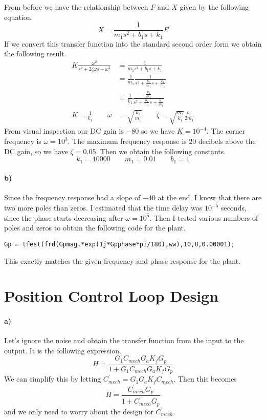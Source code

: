 \documentclass[12pt]{article}
\begin{document}
From before we have the relationship between \(F\) and \(X\) given by the following equation.
\[X=\frac{1}{m_1s^2 + b_1s + k_1}F\]
If we convert this transfer function into the standard second order form we obtain the following result.
\begin{align*}
    K\frac{\omega^2}{s^2+2\zeta\omega s + \omega^2}&=\frac{1}{m_1s^2 + b_1s + k_1}\\
    &=\frac{1}{m_1}\frac{1}{s^2 + \frac{b_1}{m_1}s + \frac{k_1}{m_1}}\\
    &=\frac{1}{k_1}\frac{\frac{k_1}{m_1}}{s^2 + \frac{b_1}{m_1}s + \frac{k_1}{m_1}}\\
    K=\frac{1}{k_1}\qquad \omega&=\sqrt{\frac{k_1}{m_1}}\qquad\zeta=\sqrt{\frac{m_1}{k_1}}\frac{b_1}{2m_1}
\end{align*}
From visual inspection our DC gain is \(-80\) so we have \(K=10^{-4}\). The corner frequency is \(\omega=10^3\).
The maximum frequency response is \(20\) decibels above the DC gain, so we have \(\zeta=0.05\). Then we obtain
the following constants.
\[k_1=10000 \qquad m_1=0.01 \qquad b_1=1\]

\paragraph{b)}

Since the frequency response had a slope of \(-40\) at the end, I know that there are two more poles than zeros.
I estimated that the time delay was \(10^{-5}\) seconds, since the phase starts decreasing after \(\omega=10^5\).
Then I tested various numbers of poles and zeros to obtain the following code for the plant.
\begin{verbatim}
Gp = tfest(frd(Gpmag.*exp(1j*Gpphase*pi/180),ww),10,8,0.00001);
\end{verbatim}
This exactly matches the given frequency and phase response for the plant.

\section{Position Control Loop Design}

\paragraph{a)}

Let's ignore the noise and obtain the transfer function from the input to the output. It is the following expression.
\[H = \frac{G_1C_{mech}G_aK_fG_p}{1+G_1C_{mech}G_aK_fG_p}\]
We can simplify this by letting \(C^\prime_{mech}=G_1G_aK_fC_{mech}\). Then this becomes
\[H = \frac{C^\prime_{mech}G_p}{1+C^\prime_{mech}G_p}\]
and we only need to worry about the design for \(C^\prime_{mech}\).
\end{document}
